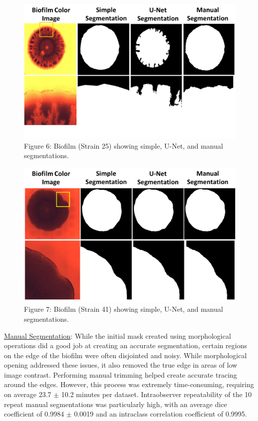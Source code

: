 \documentclass[conference]{IEEEtran}
\begin{document}
\begin{figure}[h]
\centering
\includegraphics[scale=0.25]{Slide6.PNG}
\caption{Figure 6: Biofilm (Strain 25) showing simple, U-Net, and manual segmentations.}
\label{figName6}
\end{figure}

\begin{figure}[h]
\centering
\includegraphics[scale=0.25]{Slide7.PNG}
\caption{Figure 7: Biofilm (Strain 41) showing simple, U-Net, and manual segmentations.}
\label{figName7}
\end{figure}

\ul{Manual Segmentation}: While the initial mask created using morphological operations did a good job at creating an accurate segmentation, certain regions on the edge of the biofilm were often disjointed and noisy. While morphological opening addressed these issues, it also removed the true edge in areas of low image contrast. Performing manual trimming helped create accurate tracing around the edges. However, this process was extremely time-consuming, requiring on average 23.7 $\pm$ 10.2 minutes per dataset. Intraobserver repeatability of the 10 repeat manual segmentations was particularly high, with an average dice coefficient of 0.9984 $\pm$ 0.0019 and an intraclass correlation coefficient of 0.9995.
\end{document}
